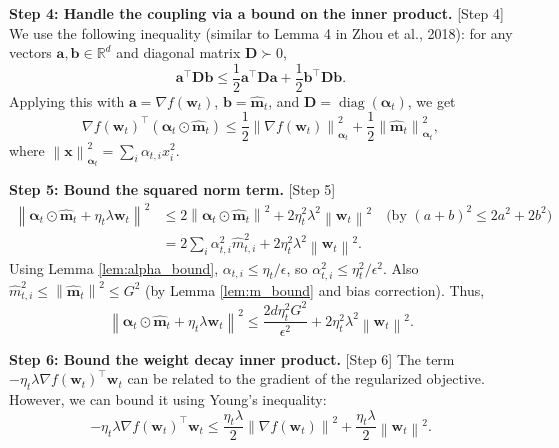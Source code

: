 \documentclass{article}
\theoremstyle{plain}
\theoremstyle{definition}
\DeclareMathOperator{\diag}{diag}
\renewcommand{\vec}[1]{\boldsymbol{#1}}
\newcommand{\norm}[1]{\left\| #1 \right\|}
\newcommand{\R}{\mathbb{R}}
\begin{document}
\textbf{Step 4: Handle the coupling via a bound on the inner product.} [Step 4]
We use the following inequality (similar to Lemma 4 in Zhou et al., 2018): for any vectors $\vec{a}, \vec{b} \in \R^d$ and diagonal matrix $\vec{D} \succ 0$,
\begin{equation}
    \vec{a}^\top \vec{D} \vec{b} \le \frac{1}{2} \vec{a}^\top \vec{D} \vec{a} + \frac{1}{2} \vec{b}^\top \vec{D} \vec{b}.
\end{equation}
Applying this with $\vec{a} = \nabla f(\vec{w}_t)$, $\vec{b} = \hat{\vec{m}}_t$, and $\vec{D} = \diag(\vec{\alpha}_t)$, we get
\begin{equation}
    \nabla f(\vec{w}_t)^\top (\vec{\alpha}_t \odot \hat{\vec{m}}_t) \le \frac{1}{2} \norm{\nabla f(\vec{w}_t)}_{\vec{\alpha}_t}^2 + \frac{1}{2} \norm{\hat{\vec{m}}_t}_{\vec{\alpha}_t}^2, \label{eq:inner_bound}
\end{equation}
where $\norm{\vec{x}}_{\vec{\alpha}_t}^2 = \sum_i \alpha_{t,i} x_i^2$.

\textbf{Step 5: Bound the squared norm term.} [Step 5]
\begin{align}
    \norm{\vec{\alpha}_t \odot \hat{\vec{m}}_t + \eta_t \lambda \vec{w}_t}^2
    &\le 2 \norm{\vec{\alpha}_t \odot \hat{\vec{m}}_t}^2 + 2 \eta_t^2 \lambda^2 \norm{\vec{w}_t}^2 \quad \text{(by $(a+b)^2 \le 2a^2+2b^2$)} \\
    &= 2 \sum_i \alpha_{t,i}^2 \hat{m}_{t,i}^2 + 2 \eta_t^2 \lambda^2 \norm{\vec{w}_t}^2.
\end{align}
Using Lemma \ref{lem:alpha_bound}, $\alpha_{t,i} \le \eta_t / \epsilon$, so $\alpha_{t,i}^2 \le \eta_t^2 / \epsilon^2$. Also $\hat{m}_{t,i}^2 \le \norm{\hat{\vec{m}}_t}^2 \le G^2$ (by Lemma \ref{lem:m_bound} and bias correction). Thus,
\begin{equation}
    \norm{\vec{\alpha}_t \odot \hat{\vec{m}}_t + \eta_t \lambda \vec{w}_t}^2 \le \frac{2 d \eta_t^2 G^2}{\epsilon^2} + 2 \eta_t^2 \lambda^2 \norm{\vec{w}_t}^2. \label{eq:norm_bound}
\end{equation}

\textbf{Step 6: Bound the weight decay inner product.} [Step 6]
The term $-\eta_t \lambda \nabla f(\vec{w}_t)^\top \vec{w}_t$ can be related to the gradient of the regularized objective. However, we can bound it using Young's inequality:
\begin{equation}
    -\eta_t \lambda \nabla f(\vec{w}_t)^\top \vec{w}_t \le \frac{\eta_t \lambda}{2} \norm{\nabla f(\vec{w}_t)}^2 + \frac{\eta_t \lambda}{2} \norm{\vec{w}_t}^2. \label{eq:wd_bound}
\end{equation}
\end{document}
